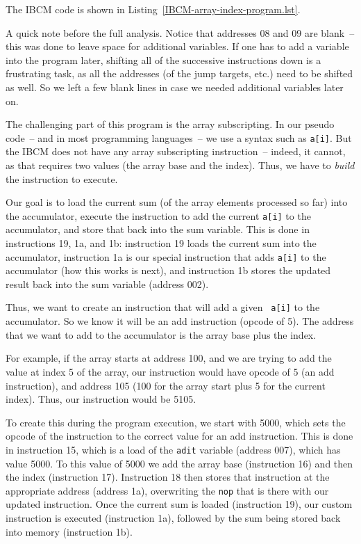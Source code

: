 The IBCM code is shown in Listing~\ref{IBCM-array-index-program.lst}.

\begin{figure}[h!]

\end{figure}

A quick note before the full analysis.  Notice that addresses 08
and 09 are blank~-- this was done to leave space for additional
variables.  If one has to add a variable into the program later,
shifting all of the successive instructions down is a frustrating
task, as all the addresses (of the jump targets, etc.)  need to be
shifted as well. So we left a few blank lines in case we needed
additional variables later on.

The challenging part of this program is the array subscripting.  In
our pseudo code~-- and in most programming languages~-- we use a syntax
such as {\tt a[i]}.  But the IBCM does not have any array subscripting
instruction~-- indeed, it cannot, as that requires two values (the
array base and the index). Thus, we have to {\em build} the
instruction to execute.

Our goal is to load the current sum (of the array elements processed
so far) into the accumulator, execute the instruction to add the
current {\tt a[i]} to the accumulator, and store that back into the
sum variable.  This is done in instructions 19, 1a, and 1b:
instruction 19 loads the current sum into the accumulator, instruction
1a is our special instruction that adds {\tt a[i]} to the accumulator
(how this works is next), and instruction 1b stores the updated result
back into the sum variable (address 002).

Thus, we want to create an instruction that will add a given {\tt
  a[i]} to the accumulator.  So we know it will be an add instruction
(opcode of 5).  The address that we want to add to the accumulator is
the array base plus the index.

For example, if the array starts at address 100, and we are trying to
add the value at index 5 of the array, our instruction would have
opcode of 5 (an add instruction), and address 105 (100 for the array
start plus 5 for the current index).  Thus, our instruction would be
5105.

To create this during the program execution, we start with 5000, which
sets the opcode of the instruction to the correct value for an add
instruction.  This is done in instruction 15, which is a load of the
{\tt adit} variable (address 007), which has value 5000.  To this
value of 5000 we add the array base (instruction 16) and then the
index (instruction 17).  Instruction 18 then stores that instruction
at the appropriate address (address 1a), overwriting the {\tt nop}
that is there with our updated instruction.  Once the current sum is
loaded (instruction 19), our custom instruction is executed
(instruction 1a), followed by the sum being stored back into memory
(instruction 1b).


